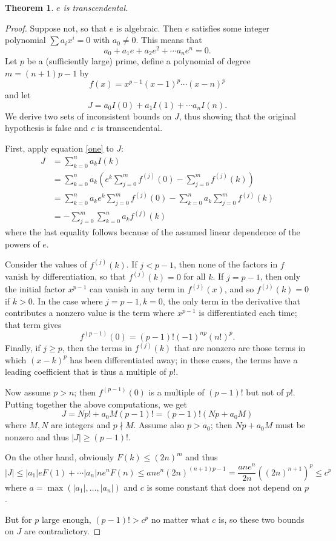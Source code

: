 \documentclass[12pt]{article}
\newcommand{\fdiff}[2]{f^{(#1)}(#2)}
\newtheorem{thm}{Theorem}
\begin{document}
\begin{thm} \label{thm:one}$e$ is transcendental.
\end{thm}
\begin{proof}
Suppose not, so that $e$ is algebraic. Then $e$ satisfies some integer polynomial $\sum a_i x^i=0$ with $a_0\neq 0$. This means that
\[a_0+a_1 e + a_2 e^2+\cdots a_n e^n=0.\]
Let $p$ be a (sufficiently large) prime, define a polynomial of degree $m=(n+1)p-1$ by
\[f(x)=x^{p-1}(x-1)^p\cdots (x-n)^p\]
and let
\[J=a_0 I(0) + a_1 I(1) + \cdots a_n I(n).\]
We derive two sets of inconsistent bounds on $J$, thus showing that the original hypothesis is false and $e$ is transcendental.

First, apply equation \eqref{one} to $J$:
\begin{align*}J&=\sum_{k=0}^n a_k I(k)\\
&= \sum_{k=0}^n a_k\left(e^k\sum_{j=0}^m \fdiff j0 - \sum_{j=0}^m \fdiff jk\right)\\
&=\sum_{k=0}^n a_k e^k \sum_{j=0}^m \fdiff j0 - \sum_{k=0}^n a_k\sum_{j=0}^m \fdiff jk\\
&=-\sum_{j=0}^m \sum_{k=0}^n a_k \fdiff jk
\end{align*}
where the last equality follows because of the assumed linear dependence of the powers of $e$.

Consider the values of $\fdiff jk$. If $j<p-1$, then none of the factors in $f$ vanish by differentiation, so that $\fdiff jk=0$ for all $k$. If $j=p-1$, then only the initial factor $x^{p-1}$ can vanish in any term in $\fdiff jx$, and so $\fdiff jk=0$ if $k>0$. In the case where $j=p-1, k=0$, the only term in the derivative that contributes a nonzero value is the term where $x^{p-1}$ is differentiated each time; that term gives
\[\fdiff{p-1}0 =(p-1)!(-1)^{np}(n!)^p.\]
Finally, if $j\geq p$, then the terms in $\fdiff jk$ that are nonzero are those terms in which $(x-k)^p$ has been differentiated away; in these cases, the terms have a leading coefficient that is thus a multiple of $p!$.

Now assume $p>n$; then $\fdiff{p-1}0$ is a multiple of $(p-1)!$ but not of $p!$. Putting together the above computations, we get
\[J=Np! +a_0M(p-1)! = (p-1)!(Np+a_0M)\]
where $M,N$ are integers and $p\nmid M$. Assume also $p>a_0$; then $Np+a_0M$ must be nonzero and thus $\lvert J\rvert \geq (p-1)!$.

On the other hand, obviously $F(k)\leq (2n)^m$ and thus
\[\lvert J\rvert\leq \lvert a_1\rvert e F(1)+\cdots \lvert a_n\rvert ne^nF(n)\leq ane^n(2n)^{(n+1)p-1}=\frac{ane^n}{2n}((2n)^{n+1})^p\leq c^p\]
where $a=\max(\lvert a_1\rvert,\ldots,\lvert a_n\rvert)$ and $c$ is some constant that does not depend on $p$.

But for $p$ large enough, $(p-1)!>c^p$ no matter what $c$ is, so these two bounds on $J$ are contradictory.
\end{proof}
\end{document}
